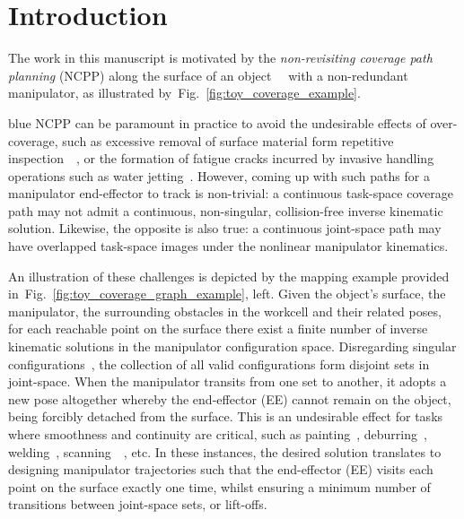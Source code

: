 \documentclass[journal]{IEEEtran}
\begin{document}
\section{Introduction}
\label{section_introduction}
The work in this manuscript is motivated by the \textit{non-revisiting coverage path planning} (NCPP) along the surface of an object~\cite{Paul2013Novel}~\cite{Bhatt2022Automated} with a non-redundant manipulator, as illustrated by~Fig.~\ref{fig:toy_coverage_example}. 
\begin{color}{blue}
NCPP can be paramount in practice to avoid the undesirable effects of  over-coverage, such as excessive removal of surface material form repetitive inspection~\cite{Han2018Tool}~\cite{Wen2022Uniform}, or the formation of fatigue cracks incurred by invasive handling operations such as water jetting~\cite{hassan2018a}.
However, %
coming up with such paths for a manipulator end-effector to track is non-trivial: a continuous task-space coverage path may not admit a continuous, non-singular, collision-free inverse kinematic solution. Likewise, the opposite is also true: a continuous joint-space path may have overlapped task-space images under the nonlinear manipulator kinematics. 
\end{color}

An illustration of these challenges is depicted by the mapping example provided in~Fig.~\ref{fig:toy_coverage_graph_example}, left. 
Given the object's surface, the manipulator, 
the surrounding obstacles in the workcell and their related poses, for each reachable point on the surface there exist a finite number of inverse kinematic solutions in the manipulator configuration space.
Disregarding singular configurations~\cite{Yoshikawa1990Translational}, the collection of all valid configurations form disjoint sets in joint-space. 
When the manipulator transits from one set to another, it adopts a new pose altogether whereby the end-effector (EE) cannot remain on the object, being forcibly detached from the surface. 
This is an undesirable effect for tasks where smoothness and continuity are critical, such as painting~\cite{li2011painting}, deburring~\cite{xie2016grinding}, welding~\cite{lee2011optimal}, scanning~\cite{Giataganas2013Cooperative}~\cite{Huo2021Robotic},  etc.
In these instances, the desired solution translates to designing manipulator trajectories such that the end-effector (EE) visits each point on the surface exactly one time, whilst ensuring a minimum number of transitions between joint-space sets, or lift-offs. 
\end{document}

